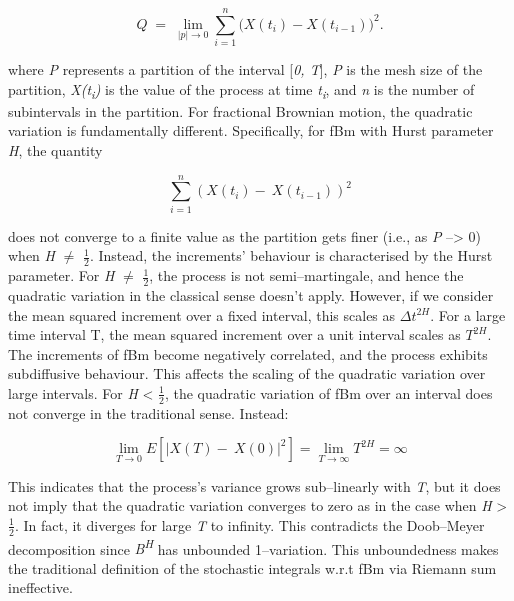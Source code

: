 \documentclass[12pt,a4paper]{report}
\numberwithin{equation}{section}
\begin{document}
\[
Q \;=\; \lim_{|p|\to 0}\sum_{i=1}^{n}\bigl(X(t_i)-X(t_{i-1})\bigr)^{2}.
\]


where \emph{P} represents a partition of the interval {[}\emph{0, T}{]},
\textbar\textbar{}\emph{P}\textbar\textbar{} is the mesh size of the
partition, \emph{X(t\textsubscript{i})} is the value of the process at
time \emph{t\textsubscript{i}}, and \emph{n} is the number of
subintervals in the partition. For fractional Brownian motion, the
quadratic variation is fundamentally different. Specifically, for fBm
with Hurst parameter \emph{H}, the quantity

\[\sum_{i = 1}^{n}{(X\left( t_{i} \right) - \ X\left( t_{i - 1} \right))}^{2}\]

does not converge to a finite value as the partition gets finer (i.e.,
as \textbar\textbar{}\emph{P}\textbar\textbar{} --\textgreater{} 0) when
\emph{H} $\neq$ $\frac{1}{2}$. Instead, the increments' behaviour is characterised by the
Hurst parameter. For \emph{H} $\neq$ $\frac{1}{2}$, the process is not semi--martingale,
and hence the quadratic variation in the classical sense doesn't apply.
However, if we consider the mean squared increment over a fixed
interval, this scales as \(\Delta t^{2H}.\) For a large time interval T,
the mean squared increment over a unit interval scales as \(T^{2H}\).
The increments of fBm become negatively correlated, and the process
exhibits subdiffusive behaviour. This affects the scaling of the
quadratic variation over large intervals. For \emph{H} \textless{} $\frac{1}{2}$,
the quadratic variation of fBm over an interval does not converge in the
traditional sense. Instead:

\[\lim_{T \rightarrow 0}{E\left\lbrack \left| X(T) - \ X(0) \right|^{2} \right\rbrack = \lim_{T \rightarrow \infty}{T^{2H} = \infty}}\]

This indicates that the process's variance grows sub--linearly with
\emph{T}, but it does not imply that the quadratic variation converges
to zero as in the case when \emph{H} \textgreater{} $\frac{1}{2}$. In fact, it
diverges for large \emph{T} to infinity. This contradicts the Doob--Meyer
decomposition since \emph{B\textsuperscript{H}} has unbounded
1--variation. This unboundedness makes the traditional definition of the
stochastic integrals w.r.t fBm via Riemann sum ineffective.
\end{document}
